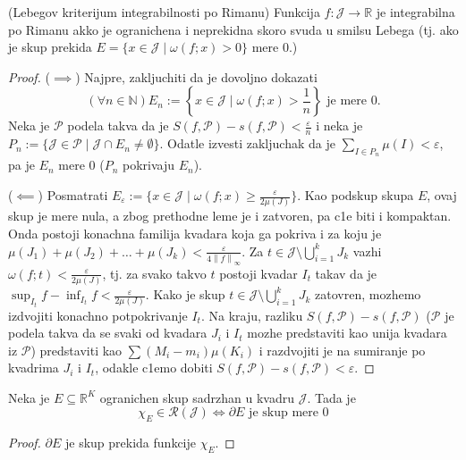 \documentclass[a4paper,12pt]{article}
\newcommand{\NN}{\mathbb{N}}
\newcommand{\RR}{\mathbb{R}}
\newcommand{\eps}{\varepsilon}
\newcommand{\psj}{\subseteq}
\newcommand{\ds}{\displaystyle}
\newcommand{\norm}[1]{\left\lVert#1\right\rVert}
\begin{document}
\begin{tma}(Lebegov kriterijum integrabilnosti po Rimanu)
	Funkcija $f: \mathcal J \to \RR$ je integrabilna po Rimanu akko je ogranichena i neprekidna skoro svuda u smilsu Lebega 
	(tj. ako je skup prekida \( E = \{x \in \mathcal J \mid \omega(f; x) > 0\} \) mere 0.)
\end{tma}
\begin{proof}
	($\implies$)
	Najpre, zakljuchiti da je dovoljno dokazati 
	\[ (\forall n \in \NN) E_n :=  \left\{x \in \mathcal J \mid \omega(f; x) > \frac{1}{n}\right\} \text{ je mere 0.}\] 
	Neka je $\mathcal P$ podela takva da je $S(f, \mathcal P) - s(f, \mathcal P) < \frac{\eps}{n}$ i neka je 
	\( P_n := \{\mathcal J \in \mathcal P \mid \mathcal J \cap E_n \neq \emptyset\} \).
	Odatle izvesti zakljuchak da je \( \ds{\sum_{I \in P_n} \mu(I) < \eps} \), pa je $E_n$ mere 0 ($P_n$ pokrivaju $E_n$).

	($\impliedby$)
	Posmatrati $E_\eps := \{ x\in \mathcal J \mid \omega(f; x) \geq \frac{\eps}{2\mu(J)}\}$. Kao podskup skupa $E$,
	ovaj skup je mere nula, a zbog prethodne leme je i zatvoren, pa c1e biti i kompaktan. Onda postoji konachna familija 
	kvadara koja ga pokriva i za koju je $\mu(J_1) + \mu(J_2) + \dotso + \mu(J_k) < \frac{\eps}{4\norm{f}_\infty}$.
	Za $t \in \mathcal J \setminus \bigcup_{i=1}^k J_k$ vazhi \( \omega(f; t) < \frac{\eps}{2\mu(J)}\), tj.
	za svako takvo $t$ postoji kvadar $I_t$ takav da je $\sup_{I_t}f - \inf_{I_t}f< \frac{\eps}{2\mu(J)} $.
	Kako je skup $t \in \mathcal J \setminus \bigcup_{i=1}^k J_k$ zatovren, mozhemo izdvojiti konachno potpokrivanje $I_t$.
	Na kraju, razliku $S(f, \mathcal P) - s(f, \mathcal P)$ ($\mathcal P$ je podela takva da se svaki od kvadara $J_i$ i $I_t$ mozhe predstaviti
	kao unija kvadara iz $\mathcal P$) predstaviti kao $\sum (M_i - m_i) \mu(K_i)$ i razdvojiti je 
	na sumiranje po kvadrima $J_i$ i $I_t$, odakle c1emo dobiti $S(f, \mathcal P) - s(f, \mathcal P) < \eps$.
\end{proof}

\begin{posl}
	Neka je $E\psj \RR^K$ ogranichen skup sadrzhan u kvadru $\mathcal J$. Tada je 
	\[ \chi_E \in \mathcal R (\mathcal J) \iff \partial E \text{ je skup mere 0} \] 
\end{posl}
\begin{proof}
	$\partial E$ je skup prekida funkcije $\chi_E$.
\end{proof}
\end{document}
